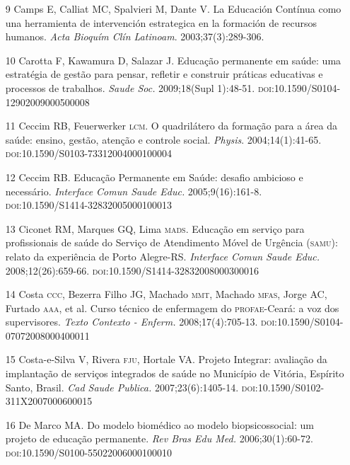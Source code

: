 \documentclass{article}
\begin{document}
\begin{itemize}
\item[9] Camps E, Calliat MC, Spalvieri M, Dante V. La Educación Contínua como
una herramienta de intervención estrategica en la formación de recursos humanos.
\textit{Acta Bioquím Clín Latinoam}. 2003;37(3):289-306.

\item[10] Carotta F, Kawamura D, Salazar J. Educação permanente em saúde: uma
estratégia de gestão para pensar, refletir e construir práticas educativas e
processos de trabalhos. \textit{Saude Soc.}
2009;18(Supl 1):48-51. \textsc{doi}:10.1590/S0104-12902009000500008

\item[11] Ceccim RB, Feuerwerker \textsc{lcm}. O quadrilátero da formação para a área da
saúde: ensino, gestão, atenção e controle social. \textit{Physis}. 2004;14(1):41-65. \textsc{doi}:10.1590/S0103-73312004000100004

\item[12] Ceccim RB. Educação Permanente em Saúde: desafio ambicioso e
necessário. \textit{Interface Comun Saude Educ.}
2005;9(16):161-8. \textsc{doi}:10.1590/S1414-32832005000100013

\item[13] Ciconet RM, Marques GQ, Lima \textsc{mads}. Educação em serviço para
profissionais de saúde do Serviço de Atendimento Móvel de Urgência (\textsc{samu}):
relato da experiência de Porto Alegre-RS. \textit{Interface Comun Saude Educ.}
2008;12(26):659-66. \textsc{doi}:10.1590/S1414-32832008000300016

\item[14] Costa \textsc{ccc}, Bezerra Filho JG, Machado \textsc{mmt}, Machado \textsc{mfas}, Jorge AC,
Furtado \textsc{aaa}, et al. Curso técnico de enfermagem do \textsc{profae}-Ceará: a voz dos
supervisores. \textit{Texto Contexto - Enferm.}
2008;17(4):705-13. \textsc{doi}:10.1590/S0104-07072008000400011

\item[15] Costa-e-Silva V, Rivera \textsc{fju}, Hortale VA. Projeto Integrar: avaliação
da implantação de serviços integrados de saúde no Município de Vitória, Espírito
Santo, Brasil. \textit{Cad Saude Publica.}
2007;23(6):1405-14. \textsc{doi}:10.1590/S0102-311X2007000600015

\item[16] De Marco MA. Do modelo biomédico ao modelo biopsicossocial: um projeto
de educação permanente. \textit{Rev Bras Edu Med.}
2006;30(1):60-72. \textsc{doi}:10.1590/S0100-55022006000100010


\end{itemize}
\end{document}
